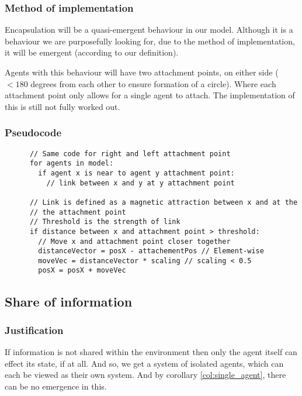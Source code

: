 \documentclass{article}
\begin{document}
    \subsubsection{Method of implementation}
      
      Encapsulation will be a quasi-emergent behaviour in our model. Although it is a behaviour we are purposefully looking for, due to the method of implementation, it will be emergent (according to our definition).

      Agents with this behaviour will have two attachment points, on either side ($<180$ degrees from each other to ensure formation of a circle). Where each attachment point only allows for a single agent to attach. The implementation of this is still not fully worked out.

    \subsubsection{Pseudocode}

      \begin{verbatim}
      // Same code for right and left attachment point
      for agents in model:
        if agent x is near to agent y attachment point:
          // link between x and y at y attachment point

      // Link is defined as a magnetic attraction between x and at the
      // the attachment point
      // Threshold is the strength of link
      if distance between x and attachment point > threshold:
        // Move x and attachment point closer together
        distanceVector = posX - attachementPos // Element-wise 
        moveVec = distanceVector * scaling // scaling < 0.5
        posX = posX + moveVec
      \end{verbatim}


  \subsection{Share of information}
  
    \subsubsection{Justification}
      
    If information is not shared within the environment then only the agent itself can effect its state, if at all. And so, we get a system of isolated agents, which can each be viewed as their own system. And by corollary \ref{col:single_agent}, there can be no emergence in this.
\end{document}
